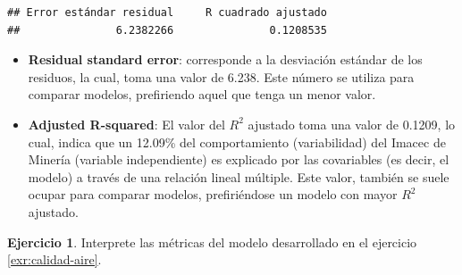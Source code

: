 \documentclass[
  11pt,
]{book}
\theoremstyle{definition}
\theoremstyle{definition}
\theoremstyle{definition}
\newtheorem{exercise}{Ejercicio}[chapter]
\theoremstyle{definition}
\theoremstyle{remark}
\begin{document}
\begin{verbatim}
## Error estándar residual     R cuadrado ajustado 
##               6.2382266               0.1208535
\end{verbatim}

\begin{itemize}
\item
  \textbf{Residual standard error}: corresponde a la desviación estándar de los residuos, la cual, toma una valor de 6.238. Este número se utiliza para comparar modelos, prefiriendo aquel que tenga un menor valor.
\item
  \textbf{Adjusted R-squared}: El valor del \(R^2\) ajustado toma una valor de 0.1209, lo cual, indica que un 12.09\% del comportamiento (variabilidad) del Imacec de Minería (variable independiente) es explicado por las covariables (es decir, el modelo) a través de una relación lineal múltiple. Este valor, también se suele ocupar para comparar modelos, prefiriéndose un modelo con mayor \(R^2\) ajustado.
\end{itemize}

\begin{exercise}
Interprete las métricas del modelo desarrollado en el ejercicio \ref{exr:calidad-aire}.
\end{exercise}
\end{document}
